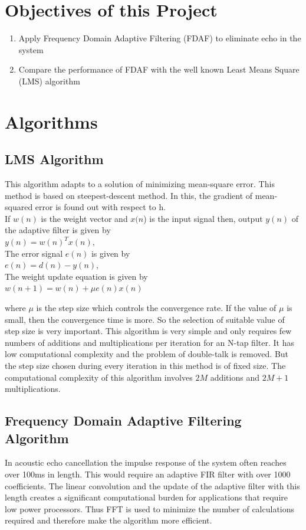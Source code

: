 \documentclass[conference]{IEEEtran}
\begin{document}
\section{Objectives of this Project}
\begin{enumerate}
    \item Apply Frequency Domain Adaptive Filtering (FDAF) to eliminate echo in the system
    \item Compare the performance of FDAF with the well known Least Means Square (LMS) algorithm
\end{enumerate}

\section{Algorithms}
\subsection{LMS Algorithm}
This algorithm adapts to a solution of minimizing mean-square error. This method is based on steepest-descent method. In this, the gradient of mean-squared error is found out with respect to h.\\  If $w(n)$ is the weight vector and $x(n$) is the input signal then, output $y(n)$ of the adaptive filter is given by \\$y(n) = w(n)^Tx(n)$,\\ The error signal $e(n)$ is given by \\$e(n) = d(n)-y(n)$, \\
The weight update equation is given by \\$w(n+1) = w(n) + \mu e(n) x(n)$

where $\mu$ is the step size which controls the convergence rate. If the value of $\mu$ is small, then the convergence time is more. So the selection of suitable value of step size is very important. This algorithm is very simple and only requires few numbers of additions and multiplications per iteration for an N-tap filter. It has low computational complexity and the problem of double-talk is removed. But the step size chosen during every iteration in this method is of fixed size. The computational complexity of this algorithm involves $2M$ additions and $2M+1$ multiplications.

\subsection{Frequency Domain Adaptive Filtering Algorithm}
In acoustic echo cancellation the impulse response of the system often reaches over 100ms in length. This would require an adaptive FIR filter with over 1000 coefficients. The linear convolution and the update of the adaptive filter with this length creates a significant computational burden for applications that require low power processors. Thus FFT is used to minimize the number of calculations required and therefore make the algorithm more efficient.\\
\end{document}
